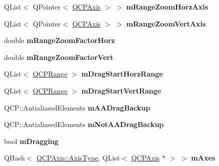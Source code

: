 \begin{DoxyCompactItemize}
\item 
\mbox{\label{classQCPAxisRect_aa35eeb02f68b63f2069fcc80c9334b91}} 
Q\+List$<$ Q\+Pointer$<$ \hyperlink{classQCPAxis}{Q\+C\+P\+Axis} $>$ $>$ {\bfseries m\+Range\+Zoom\+Horz\+Axis}
\item 
\mbox{\label{classQCPAxisRect_aafb0e243294c158668499fd62cee057c}} 
Q\+List$<$ Q\+Pointer$<$ \hyperlink{classQCPAxis}{Q\+C\+P\+Axis} $>$ $>$ {\bfseries m\+Range\+Zoom\+Vert\+Axis}
\item 
\mbox{\label{classQCPAxisRect_ad08d0250ed7b99de387d0ea6c7fd4dc1}} 
double {\bfseries m\+Range\+Zoom\+Factor\+Horz}
\item 
\mbox{\label{classQCPAxisRect_a32f063629581d5bf82b12769940b34ad}} 
double {\bfseries m\+Range\+Zoom\+Factor\+Vert}
\item 
\mbox{\label{classQCPAxisRect_a274aef08c4de084a3f26c3e92fac3a79}} 
Q\+List$<$ \hyperlink{classQCPRange}{Q\+C\+P\+Range} $>$ {\bfseries m\+Drag\+Start\+Horz\+Range}
\item 
\mbox{\label{classQCPAxisRect_ab362ee8f71a156d812a1ea793a1e42cb}} 
Q\+List$<$ \hyperlink{classQCPRange}{Q\+C\+P\+Range} $>$ {\bfseries m\+Drag\+Start\+Vert\+Range}
\item 
\mbox{\label{classQCPAxisRect_aa4a24f76360cfebe1bcf17a77fa7521b}} 
Q\+C\+P\+::\+Antialiased\+Elements {\bfseries m\+A\+A\+Drag\+Backup}
\item 
\mbox{\label{classQCPAxisRect_a6fcb12e052e276d57efbb128be31d6f5}} 
Q\+C\+P\+::\+Antialiased\+Elements {\bfseries m\+Not\+A\+A\+Drag\+Backup}
\item 
\mbox{\label{classQCPAxisRect_ab49a6698194cf0e9e38a1d734c0888a8}} 
bool {\bfseries m\+Dragging}
\item 
\mbox{\label{classQCPAxisRect_afe7a24d2a2bea98fc552fa826350ba81}} 
Q\+Hash$<$ \hyperlink{classQCPAxis_ae2bcc1728b382f10f064612b368bc18a}{Q\+C\+P\+Axis\+::\+Axis\+Type}, Q\+List$<$ \hyperlink{classQCPAxis}{Q\+C\+P\+Axis} $\ast$ $>$ $>$ {\bfseries m\+Axes}
\end{DoxyCompactItemize}

